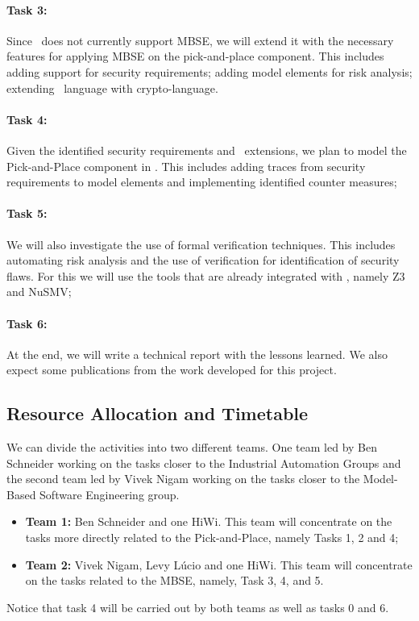 \paragraph{Task 3:} Since \autofocus\ does not currently support MBSE, we will extend it with the necessary features for applying MBSE on the pick-and-place component. This includes adding support for security requirements; adding model elements for risk analysis; extending \autofocus\ language with crypto-language.

\paragraph{Task 4:} Given the identified security requirements and \autofocus\ extensions, we plan to model the Pick-and-Place component in \autofocus. This includes adding traces from security requirements to model elements and implementing identified counter measures;

\paragraph{Task 5:} We will also investigate the use of formal verification techniques. This includes automating risk analysis and the use of verification for identification of security flaws. For this we will use the tools that are already integrated with \autofocus, namely Z3 and NuSMV;

\paragraph{Task 6:} At the end, we will write a technical report with the lessons learned. We also expect some publications from the work developed for this project.


\subsection{Resource Allocation and Timetable}

We can divide the activities into two different teams. One team led by Ben Schneider working on the tasks closer to the Industrial Automation Groups and the second team led by Vivek Nigam working on the tasks closer to the Model-Based Software Engineering group.

\begin{itemize}
  \item \textbf{Team 1:} Ben Schneider and one HiWi. This team will concentrate on the tasks more directly related to the Pick-and-Place, namely Tasks 1, 2 and 4;
  \item \textbf{Team 2:} Vivek Nigam, Levy Lúcio and one HiWi. This team will concentrate on the tasks related to the MBSE, namely, Task 3, 4, and 5.
\end{itemize}
Notice that task 4 will be carried out by both teams as well as tasks 0 and 6.

